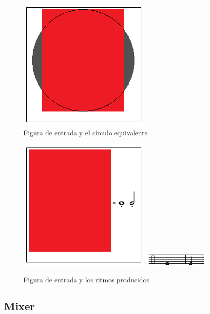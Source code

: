		\begin{figure}[htbp]
		\centering
		\hspace*{0.0in}
		\includegraphics[scale=1]{graphics/simpletest2-Circulo.png}
		\caption{Figura de entrada y el círculo equivalente}
		\label{fig:Figura2Voz4}
		\end{figure}

		\begin{figure}[htbp]
		\centering
		\hspace*{0.0in}
		\includegraphics[scale=1]{graphics/simpletest2-F2F3_3.png}
		\includegraphics[scale=1]{graphics/simpletest2-PERpartitura.png}
		\caption{Figura de entrada y los ritmos producidos}
		\label{fig:Figura3Voz4}
		\end{figure}


\subsection{Mixer}

